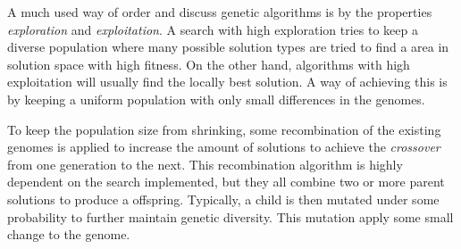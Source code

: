A much used way of order and discuss genetic algorithms is by the properties \textit{exploration} and \textit{exploitation}. A search with high exploration tries to keep a diverse population where many possible solution types are tried to find a area in solution space with high fitness. On the other hand, algorithms with high exploitation will usually find the locally best solution. A way of achieving this is by keeping a uniform population with only small differences in the genomes.

To keep the population size from shrinking, some recombination of the existing genomes is applied to increase the amount of solutions to achieve the \textit{crossover} from one generation to the next. This recombination algorithm is highly dependent on the search implemented, but they all combine two or more parent solutions to produce a offspring. Typically, a child is then mutated under some probability to further maintain genetic diversity. This mutation apply some small change to the genome.

